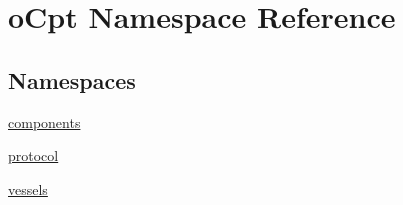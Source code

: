 \hypertarget{namespaceo_cpt}{}\section{o\+Cpt Namespace Reference}
\label{namespaceo_cpt}
\subsection*{Namespaces}
\begin{DoxyCompactItemize}
\item 
 \hyperlink{namespaceo_cpt_1_1components}{components}
\item 
 \hyperlink{namespaceo_cpt_1_1protocol}{protocol}
\item 
 \hyperlink{namespaceo_cpt_1_1vessels}{vessels}
\end{DoxyCompactItemize}
